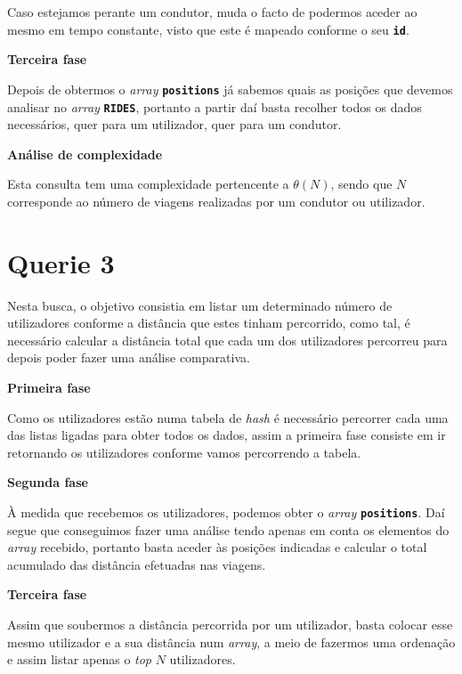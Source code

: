 \documentclass[12pt,a4paper]{report}
\begin{document}
Caso estejamos perante um condutor, muda o facto de podermos aceder ao mesmo em tempo constante, visto que este é mapeado conforme o seu \textbf{\small\texttt{id}}.

\normalsize\textbf{Terceira fase }{\titlerule[0.5pt]}

Depois de obtermos o \textit{array} \textbf{\small\texttt{positions}} já sabemos quais as posições que devemos analisar no \textit{array} \textbf{\small\texttt{RIDES}}, portanto a partir daí basta recolher todos os dados necessários, quer para um utilizador, quer para um condutor.

\normalsize\textbf{Análise de complexidade }{\titlerule[0.5pt]}

Esta consulta tem uma complexidade pertencente a \(\theta(N)\), sendo que \(N\) corresponde ao número de viagens realizadas por um condutor ou utilizador.

\vspace{-6pt}
\section{Querie 3}

Nesta busca, o objetivo consistia em listar um determinado número de utilizadores conforme a distância que estes tinham percorrido, como tal, é necessário calcular a distância total que cada um dos utilizadores percorreu para depois poder fazer uma análise comparativa.

\normalsize\textbf{Primeira fase }{\titlerule[0.5pt]}

Como os utilizadores estão numa tabela de \textit{hash} é necessário percorrer cada uma das listas ligadas para obter todos os dados, assim a primeira fase consiste em ir retornando os utilizadores conforme vamos percorrendo a tabela.

\normalsize\textbf{Segunda fase }{\titlerule[0.5pt]}

À medida que recebemos os utilizadores, podemos obter o \textit{array} \textbf{\small\texttt{positions}}. Daí segue que conseguimos fazer uma análise tendo apenas em conta os elementos do \textit{array} recebido, portanto basta aceder às posições indicadas e calcular o total acumulado das distância efetuadas nas viagens.

\normalsize\textbf{Terceira fase }{\titlerule[0.5pt]}

Assim que soubermos a distância percorrida por um utilizador, basta colocar esse mesmo utilizador e a sua distância num \textit{array}, a meio de fazermos uma ordenação e assim listar apenas o \textit{top} \(N\) utilizadores.
\end{document}
